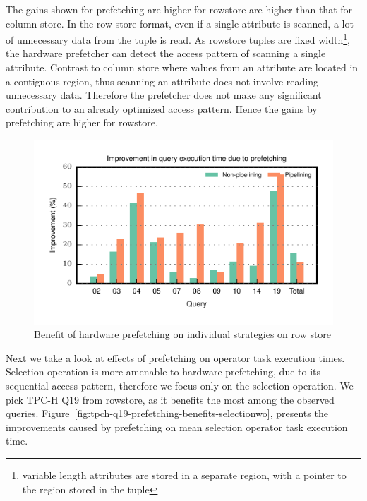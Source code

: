 The gains shown for prefetching are higher for rowstore are higher than that for column store. 
In the row store format, even if a single attribute is scanned, a lot of unnecessary data from the tuple is read.
As rowstore tuples are fixed width\footnote{variable length attributes are stored in a separate region, with a pointer to the region stored in the tuple}, the hardware prefetcher can detect the access pattern of scanning a single attribute. 
Contrast to column store where values from an attribute are located in a contiguous region, thus scanning an attribute does not involve reading unnecessary data. 
Therefore the prefetcher does not make any significant contribution to an already optimized access pattern.
Hence the gains by prefetching are higher for rowstore. 
\begin{figure}
	\centering 
	\includegraphics[width=0.6\textheight]{pipeline/figures/prefetching-improvement-tpch-rowstore-20threads-bs2mb}
	\caption{Benefit of hardware prefetching on individual strategies on row store}
	\label{fig:prefetching-vs-noprefetching-rowstore}
\end{figure}

Next we take a look at effects of prefetching on operator task execution times. 
Selection operation is more amenable to hardware prefetching, due to its sequential access pattern, therefore we focus only on the selection operation. 
We pick TPC-H Q19 from rowstore, as it benefits the most among the observed queries.	
Figure~\ref{fig:tpch-q19-prefetching-benefits-selectionwo}, presents the improvements caused by prefetching on mean selection operator task execution time. 

